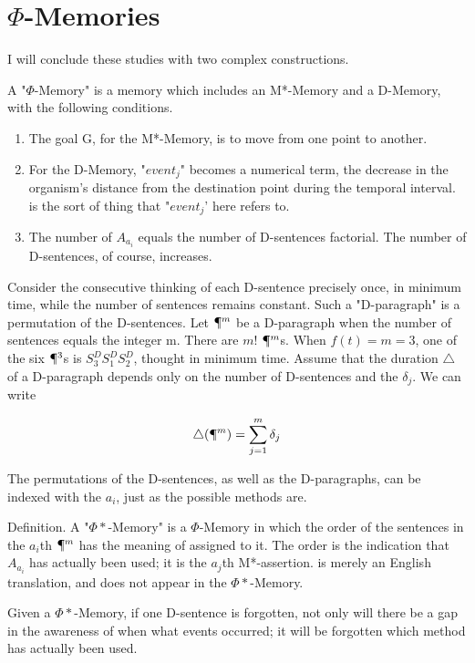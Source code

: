 \section{$\Phi$-Memories}
I will conclude these studies with two complex constructions. 

 A "$\Phi$-Memory" is a memory which includes an M*-Memory 
and a D-Memory, with the following conditions. 
\begin{enumerate}
\item The goal G, for the M*-Memory, is to move from one point to another. 

\item For the D-Memory, "$event_j$" becomes a numerical term, the decrease in the organism's distance 
from the destination point during the temporal interval.  is the sort of thing that "$event_j$' here refers to. 

\item The number of $A_{a_i}$ equals the number of D-sentences factorial. The number 
of D-sentences, of course, increases. 
\end{enumerate}

Consider the consecutive thinking of each D-sentence precisely once, in 
minimum time, while the number of sentences remains constant. Such a 
"D-paragraph" is a permutation of the D-sentences. Let $\mathparagraph^m$ be a 
D-paragraph when the number of sentences equals the integer m. There are 
$m!$ $\mathparagraph^m$s. When $f(t)=m=3$, one of the six $\mathparagraph^3$s is $S^D_3 S^D_1 S^D_2$, 
thought in 
minimum time. Assume that the duration $\triangle$ of a D-paragraph depends only 
on the number of D-sentences and the $\delta_j$. We can write 

$$ \triangle(\mathparagraph^m)=\sum_{j=1}^{m} \delta_j $$

The permutations of the D-sentences, as well as the D-paragraphs, can be 
indexed with the $a_i$, just as the possible methods are. 

Definition. A "$\Phi*$-Memory" is a $\Phi$-Memory in which the order of the 
sentences in the $a_i$th $\mathparagraph^m$ has the meaning of 
assigned to it. The order is the indication that $A_{a_i}$ has actually been used; it 
is the $a_j$th M*-assertion.  is merely an English 
translation, and does not appear in the $\Phi*$-Memory. 

 Given a $\Phi*$-Memory, if one D-sentence is forgotten, not 
only will there be a gap in the awareness of when what events occurred; it 
will be forgotten which method has actually been used. 

